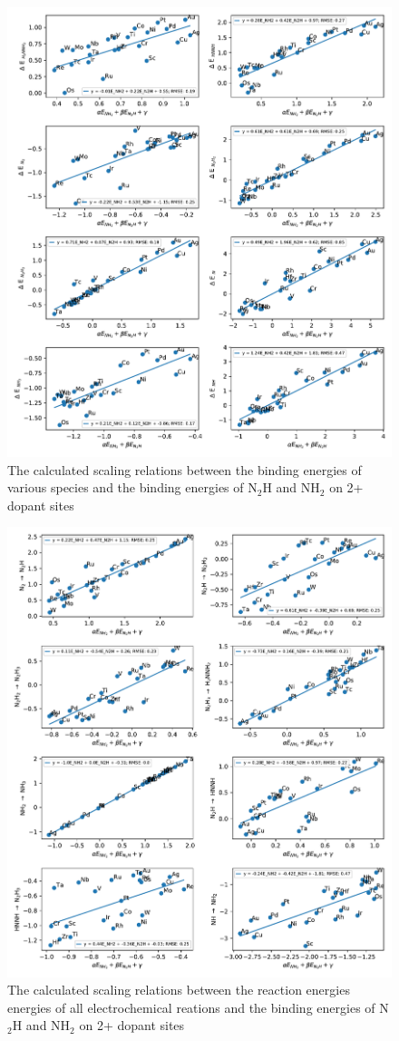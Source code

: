 \documentclass[journal=jacsat,manuscript=article]{achemso}
\begin{document}
\begin{figure}
\centering
\includegraphics[width=0.8\linewidth]{Images/scaling_species.pdf}
\caption{The calculated scaling relations between the binding energies of various species and the binding energies of N$_2$H and NH$_2$ on 2+ dopant sites}
\label{fig:scaling_species}
\end{figure}

\begin{figure}
\centering
\includegraphics[width=0.8\linewidth]{Images/scaling_reactions.pdf}
\caption{The calculated scaling relations between the reaction energies energies of all electrochemical reations and the binding energies of N$_2$H and NH$_2$ on 2+ dopant sites}
\label{fig:scaling_reactions}
\end{figure}
\end{document}
